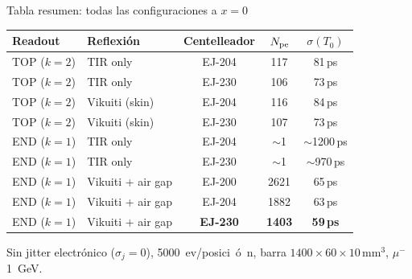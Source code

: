 \documentclass[aspectratio=169,9pt]{beamer}
\begin{document}
\begin{frame}{Tabla resumen: todas las configuraciones a $x=0$}
  \centering
  \footnotesize
  \renewcommand{\arraystretch}{1.25}
  \begin{tabular}{llccc}
    \toprule
    Readout & Reflexi\'on & Centelleador & $N_{\rm pe}$ & $\sigma(T_0)$ \\
    \midrule
    TOP ($k=2$) & TIR only   & EJ-204 & 117  & 81\,ps \\
    TOP ($k=2$) & TIR only   & EJ-230 & 106  & 73\,ps \\
    TOP ($k=2$) & Vikuiti (skin) & EJ-204 & 116  & 84\,ps \\
    TOP ($k=2$) & Vikuiti (skin) & EJ-230 & 107  & 73\,ps \\
    \midrule
    END ($k=1$) & TIR only   & EJ-204 & $\sim$1 & $\sim$1200\,ps \\
    END ($k=1$) & TIR only   & EJ-230 & $\sim$1 & $\sim$970\,ps  \\
    \midrule
    END ($k=1$) & Vikuiti + air gap & EJ-200 & 2621 & 65\,ps \\
    END ($k=1$) & Vikuiti + air gap & EJ-204 & 1882 & 63\,ps \\
    \rowcolor{rowbest}
    END ($k=1$) & Vikuiti + air gap & \textbf{EJ-230} & \textbf{1403} & \textbf{59\,ps} \\
    \bottomrule
  \end{tabular}

  \vspace{0.4em}
  \small Sin jitter electr\'onico ($\sigma_j=0$), \SI{5000}{ev/posici\'on}, barra $1400\times60\times10$\,mm$^3$, $\mu^-$ \SI{1}{GeV}.
\end{frame}
\end{document}

